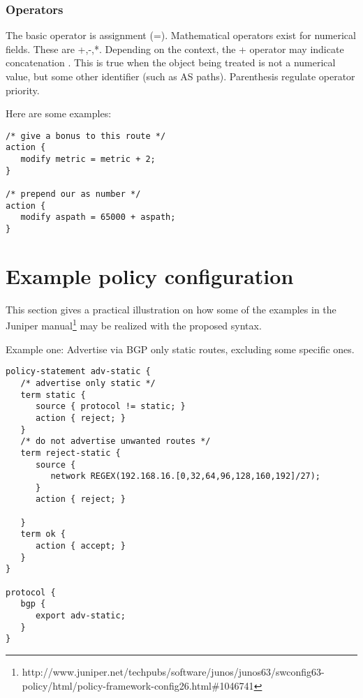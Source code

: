 \documentclass{article}
\begin{document}
\subsubsection{Operators}
The basic operator is assignment (=). Mathematical operators exist for numerical
fields. These are +,-,*. Depending on the context, the + operator may indicate
concatenation . This is true when the object being treated is not a numerical
value, but some other identifier (such as AS paths). Parenthesis regulate
operator priority.
 


Here are some examples:
\begin{verbatim}
/* give a bonus to this route */
action {
   modify metric = metric + 2;
}   

/* prepend our as number */
action {
   modify aspath = 65000 + aspath;
}
\end{verbatim}



\section{Example policy configuration}
This section gives a practical illustration on how some of the examples in the Juniper
manual\footnote{http://www.juniper.net/techpubs/software/junos/junos63/swconfig63-policy/html/policy-framework-config26.html\#1046741}
may be realized with the proposed syntax.

Example one: Advertise via BGP only static routes, excluding some specific ones.
\begin{verbatim}
policy-statement adv-static {
   /* advertise only static */
   term static {
      source { protocol != static; }
      action { reject; } 
   }
   /* do not advertise unwanted routes */
   term reject-static {
      source { 
         network REGEX(192.168.16.[0,32,64,96,128,160,192]/27); 
      }
      action { reject; }
      
   }
   term ok {
      action { accept; }
   }
}

protocol {
   bgp {
      export adv-static;
   }
}   

\end{verbatim}
\end{document}
